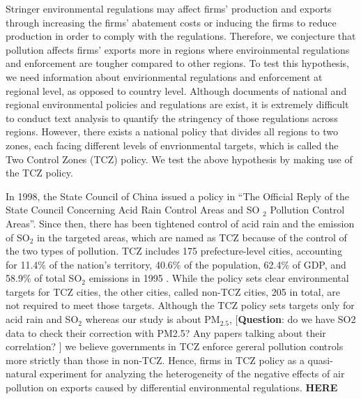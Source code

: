\documentclass[12pt]{article}
\begin{document}
\label{sec:5.2.4} Stringer environmental regulations may affect firms'
production and exports through increasing the firms' abatement costs or
inducing the firms to reduce production in order to comply with the
regulations. Therefore, we conjecture that pollution affects firms' exports
more in regions where enviroinmental regulations and enforcement are tougher
compared to other regions. To test this hypothesis, we need information
about envirionmental regulations and enforcement at regional level, as
opposed to country level. Although documents of national and regional
environmental policies and regulations are exist, it is extremely difficult
to conduct text analysis to quantify the stringency of those regulations
across regions. However, there exists a national policy that divides all
regions to two zones, each facing different levels of envrionmental targets,
which is called the Two Control Zones (TCZ) policy. We test the above
hypothesis by making use of the TCZ policy.

In 1998, the State Council of China issued a policy in \textquotedblleft The
Official Reply of the State Council Concerning Acid Rain Control Areas and SO%
$_{2}$ Pollution Control Areas\textquotedblright . Since then, there has
been tightened control of acid rain and the emission of SO$_{2}$ in the
targeted areas, which are named as TCZ because of the control of the two
types of pollution. TCZ includes 175 prefecture-level cities, accounting for
11.4\% of the nation's territory, 40.6\% of the population, 62.4\% of GDP,
and 58.9\% of total SO$_{2}$ emissions in 1995 \citep{hao2001plotting}.
While the policy sets clear environmental targets for TCZ cities, the other
cities, called non-TCZ cities, 205 in total, are not required to meet those
targets. Although the TCZ policy sets targets only for acid rain and SO$_{2}$
whereas our study is about $\mathrm{PM_{2.5}}$, [\textbf{Question}: do we
have SO2 data to check their correction with PM2.5? Any papers talking about
their correlation? ] we believe governments in TCZ enforce gereral pollution
controls more strictly than those in non-TCZ. Hence, firms in TCZ policy as
a quasi-natural experiment for analyzing the heterogeneity of the negative
effects of air pollution on exports caused by differential environmental
regulations. \textbf{HERE}
\end{document}
